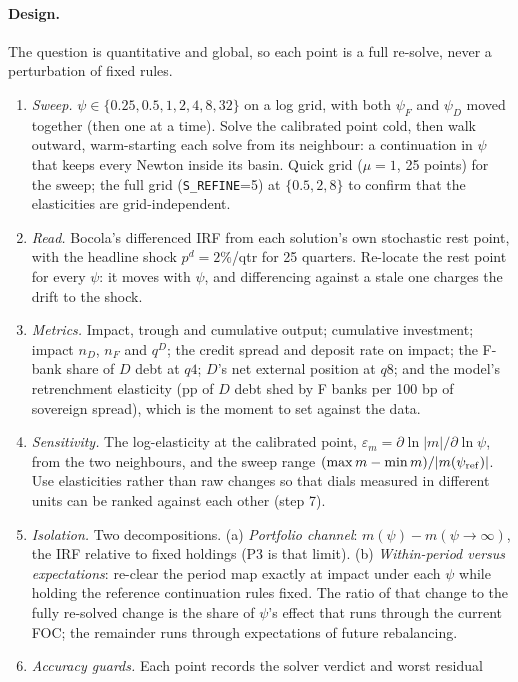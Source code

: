 \documentclass[11pt]{article}
\newcommand{\code}[1]{\texttt{\small #1}}
\begin{document}
\paragraph{Design.} The question is quantitative and global, so each point is a full re-solve,
never a perturbation of fixed rules.
\begin{enumerate}
\item \emph{Sweep.} $\psi\in\{0.25,0.5,1,2,4,8,32\}$ on a log grid, with both $\psi_F$ and
$\psi_D$ moved together (then one at a time). Solve the calibrated point cold, then walk
outward, warm-starting each solve from its neighbour: a continuation in $\psi$ that keeps every
Newton inside its basin. Quick grid ($\mu=1$, 25 points) for the sweep; the full grid
(\code{S\_REFINE}=5) at $\{0.5,2,8\}$ to confirm that the elasticities are grid-independent.
\item \emph{Read.} Bocola's differenced IRF from each solution's own stochastic rest point,
with the headline shock $p^d=2\%$/qtr for 25 quarters. Re-locate the rest point for every
$\psi$: it moves with $\psi$, and differencing against a stale one charges the drift to the
shock.
\item \emph{Metrics.} Impact, trough and cumulative output; cumulative investment; impact
$n_D$, $n_F$ and $q^D$; the credit spread and deposit rate on impact; the F-bank share of $D$
debt at $q4$; $D$'s net external position at $q8$; and the model's retrenchment elasticity
(pp of $D$ debt shed by F banks per 100 bp of sovereign spread), which is the moment to set
against the data.
\item \emph{Sensitivity.} The log-elasticity at the calibrated point,
$\varepsilon_m=\partial\ln|m|/\partial\ln\psi$, from the two neighbours, and the sweep range
$(\max m-\min m)/|m(\psi_{\rm ref})|$. Use elasticities rather than raw changes so that dials
measured in different units can be ranked against each other (step 7).
\item \emph{Isolation.} Two decompositions. (a) \emph{Portfolio channel}:
$m(\psi)-m(\psi\to\infty)$, the IRF relative to fixed holdings (P3 is that limit). (b)
\emph{Within-period versus expectations}: re-clear the period map exactly at impact under each
$\psi$ while holding the reference continuation rules fixed. The ratio of that change to the
fully re-solved change is the share of $\psi$'s effect that runs through the current FOC; the
remainder runs through expectations of future rebalancing.
\item \emph{Accuracy guards.} Each point records the solver verdict and worst residual

\end{enumerate}
\end{document}
